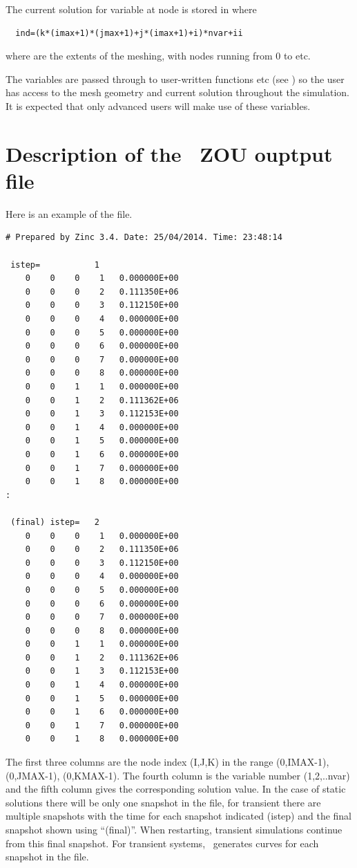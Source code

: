 \documentclass[a4paper,twoside,11pt]{book}
\begin{document}
The current solution for variable  at node  is
stored in  where
\begin{verbatim}
  ind=(k*(imax+1)*(jmax+1)+j*(imax+1)+i)*nvar+ii
\end{verbatim}
where  are the extents of the meshing, with nodes
running from 0 to  etc.

The variables  are passed through to
user-written functions  etc (see ) so the user has access to the
mesh geometry and current solution throughout the simulation. It is
expected that only advanced users will make use of these variables.

\chapter{Description of the \zinc\ ZOU ouptput file}
\label{zousec}

Here is an example of the file.
\begin{verbatim}
# Prepared by Zinc 3.4. Date: 25/04/2014. Time: 23:48:14

 istep=           1
    0    0    0    1   0.000000E+00
    0    0    0    2   0.111350E+06
    0    0    0    3   0.112150E+00
    0    0    0    4   0.000000E+00
    0    0    0    5   0.000000E+00
    0    0    0    6   0.000000E+00
    0    0    0    7   0.000000E+00
    0    0    0    8   0.000000E+00
    0    0    1    1   0.000000E+00
    0    0    1    2   0.111362E+06
    0    0    1    3   0.112153E+00
    0    0    1    4   0.000000E+00
    0    0    1    5   0.000000E+00
    0    0    1    6   0.000000E+00
    0    0    1    7   0.000000E+00
    0    0    1    8   0.000000E+00  
:

 (final) istep=   2
    0    0    0    1   0.000000E+00
    0    0    0    2   0.111350E+06
    0    0    0    3   0.112150E+00
    0    0    0    4   0.000000E+00
    0    0    0    5   0.000000E+00
    0    0    0    6   0.000000E+00
    0    0    0    7   0.000000E+00
    0    0    0    8   0.000000E+00
    0    0    1    1   0.000000E+00
    0    0    1    2   0.111362E+06
    0    0    1    3   0.112153E+00
    0    0    1    4   0.000000E+00
    0    0    1    5   0.000000E+00
    0    0    1    6   0.000000E+00
    0    0    1    7   0.000000E+00
    0    0    1    8   0.000000E+00  
\end{verbatim}
The first three columns are the node index (I,J,K) in the range
(0,IMAX-1), (0,JMAX-1), (0,KMAX-1). The fourth column is the variable
number (1,2,..nvar) and the fifth column gives the corresponding
solution value. In the case of static solutions there will be only one
snapshot in the file, for transient there are multiple snapshots with
the time for each snapshot indicated (istep) and the final snapshot
shown using ``(final)''. When restarting, transient simulations
continue from this final snapshot. For transient systems,
\zpp\ generates curves for each snapshot in the file.
\end{document}
